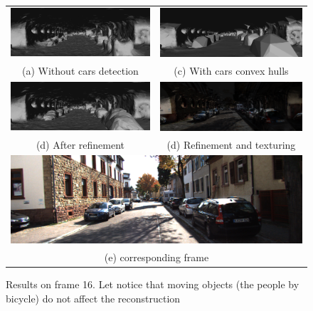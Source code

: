\begin{figure}[tp]
 \centering
\setlength{\tabcolsep}{2px}
    \begin{tabular}{cc}
    \includegraphics[width=0.45\columnwidth]{./img/ch-laser/notCar01}&
    \includegraphics[width=0.45\columnwidth]{./img/ch-laser/onlyCar01}\\
    (a) Without cars detection&
    (c) With cars convex hulls\\
    \includegraphics[width=0.45\columnwidth]{./img/ch-laser/nottextured01}&
    \includegraphics[width=0.45\columnwidth]{./img/ch-laser/textured01}\\
    (d) After refinement&
    (d) Refinement and texturing\\
    \multicolumn{2}{c}{
    \includegraphics[width=0.92\columnwidth]{./img/ch-laser/0000000016}}\\
    \multicolumn{2}{c}{(e) corresponding frame}
 \end{tabular}
 \caption{Results on frame 16. Let notice that moving objects (the people by bicycle) do not affect the reconstruction}
 \label{fig:results06}
\end{figure}


